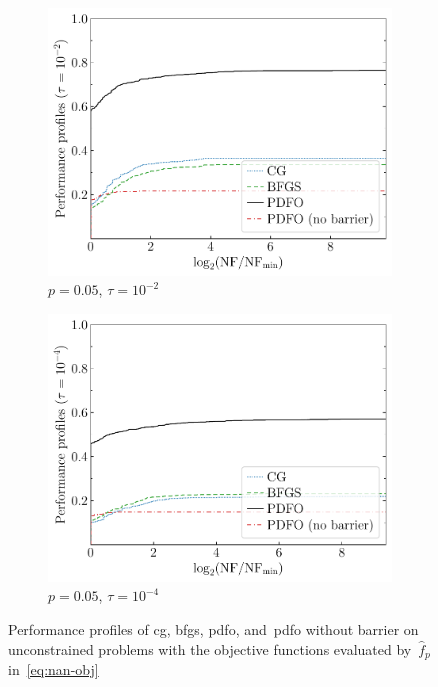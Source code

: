 \documentclass[
    smallextended,  %
    final,          %
]{svjour3}
\newcommand{\obj}{f}
\begin{document}
\begin{figure}[htbp]
\begin{subfigure}{.48\textwidth}
        \centering
        \includegraphics[width=\textwidth]{perf-nan-bfgs_cg_pdfo-50-0.05-2}
        \caption{$p = 0.05$, $\tau = 10^{-2}$}
    \end{subfigure}
    \hfill
    \begin{subfigure}{.48\textwidth}
        \centering
        \includegraphics[width=\textwidth]{perf-nan-bfgs_cg_pdfo-50-0.05-4}
        \caption{$p = 0.05$, $\tau = 10^{-4}$}
    \end{subfigure}
    \caption{Performance profiles of \gls{cg}, \gls{bfgs}, \gls{pdfo}, and~\gls{pdfo} without
        barrier on unconstrained problems
    with the objective functions evaluated by~$\hat{\obj}_p$ in~\eqref{eq:nan-obj}}
    \label{fig:nan}
\end{figure}
\end{document}
